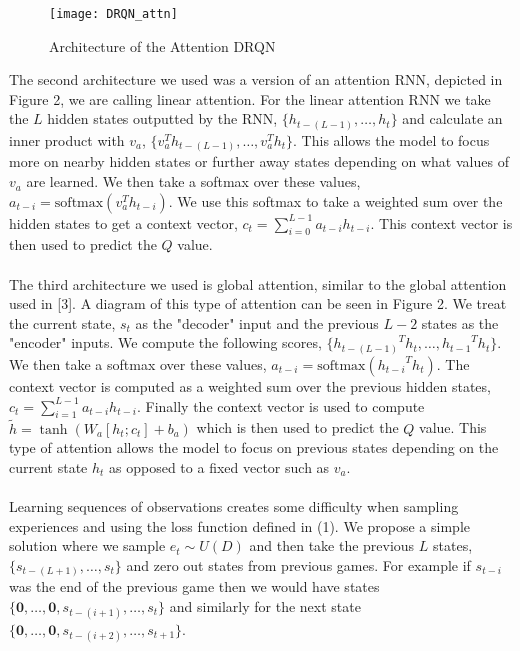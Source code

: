 \documentclass{article}
\begin{document}
\begin{figure}[h]
    \centering
    \texttt{[image: DRQN\_attn]}
    \caption{Architecture of the Attention DRQN}
\end{figure}

The second architecture we used was a version of an attention RNN, depicted in
Figure 2, we are calling linear attention. For the linear attention RNN we take
the $L$ hidden states outputted by the RNN, $\{h_{t-(L-1)}, \dots, h_{t}\}$ and
calculate an inner product with $v_a$, $\{v_a^Th_{t-(L-1)}, \dots, v_a^Th_{t}\}$.
This allows the model to focus more on nearby hidden states or further away states
depending on what values of $v_a$ are learned. We then take a softmax over these
values, $a_{t-i} = \text{softmax}(v_a^Th_{t-i})$. We use this softmax to take a weighted
sum over the hidden states to get a context vector,
$c_t = \sum_{i=0}^{L-1}a_{t-i}h_{t-i}$. This context vector is then used to predict
the $Q$ value. \\
\\
The third architecture we used is global attention, similar to the global attention
used in [3]. A diagram of this type of attention can be seen in Figure 2. We treat
the current state, $s_t$ as the "decoder" input and the previous $L - 2$ states as
the "encoder" inputs. We compute the following scores,
$\{{h_{t-(L-1)}}^Th_t, \dots, {h_{t-1}}^Th_t\}$. We then take a softmax over these
values, $a_{t-i} = \text{softmax}({h_{t-i}}^Th_t)$. The context vector is computed
as a weighted sum over the previous hidden states, $c_t = \sum_{i=1}^{L-1}a_{t-i}h_{t-i}$.
Finally the context vector is used to compute $\tilde{h} = \tanh(W_a[h_t;c_t] + b_a)$
which is then used to predict the $Q$ value. This type of attention allows the model
to focus on previous states depending on the current state $h_t$ as opposed to a
fixed vector such as $v_a$. \\
\\
Learning sequences of observations creates some difficulty when sampling
experiences and using the loss function defined in (1). We propose a simple
solution where we sample $e_t \sim U(D)$ and then take the previous $L$ states,
$\{s_{t-(L+1)}, \dots, s_t\}$ and zero out states from previous games. For example
if $s_{t-i}$ was the end of the previous game then we would have states
$\{\mathbf{0}, \dots, \mathbf{0}, s_{t-(i+1)}, \dots, s_t\}$ and similarly for the
next state $\{\mathbf{0}, \dots, \mathbf{0},s_{t-(i+2)}, \dots, s_{t+1}\}$.
\end{document}
